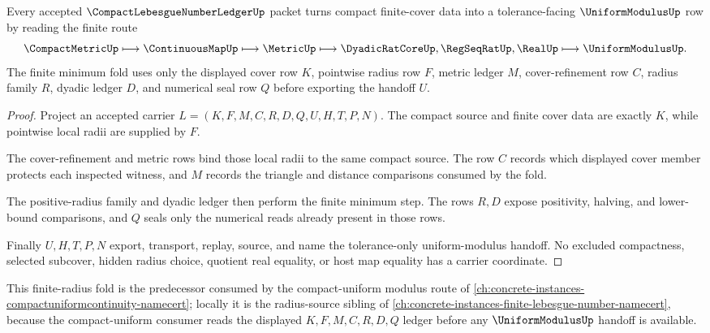 \begin{theorem}
\label{thm:compact-lebesgue-number-ledger-finite-radius-fold}
Every accepted $\CompactLebesgueNumberLedgerUp$ packet turns compact finite-cover data into a tolerance-facing $\UniformModulusUp$ row by reading the finite route
$$
\CompactMetricUp \longmapsto \ContinuousMapUp \longmapsto \MetricUp \longmapsto \DyadicRatCoreUp,\RegSeqRatUp,\RealUp \longmapsto \UniformModulusUp .
$$
The finite minimum fold uses only the displayed cover row $K$, pointwise radius row $F$, metric ledger $M$, cover-refinement row $C$, radius family $R$, dyadic ledger $D$, and numerical seal row $Q$ before exporting the handoff $U$.
\end{theorem}
\begin{proof}
Project an accepted carrier $L=(K,F,M,C,R,D,Q,U,H,T,P,N)$. The compact source and finite cover data are exactly $K$, while pointwise local radii are supplied by $F$.

The cover-refinement and metric rows bind those local radii to the same compact source. The row $C$ records which displayed cover member protects each inspected witness, and $M$ records the triangle and distance comparisons consumed by the fold.

The positive-radius family and dyadic ledger then perform the finite minimum step. The rows $R,D$ expose positivity, halving, and lower-bound comparisons, and $Q$ seals only the numerical reads already present in those rows.

Finally $U,H,T,P,N$ export, transport, replay, source, and name the tolerance-only uniform-modulus handoff. No excluded compactness, selected subcover, hidden radius choice, quotient real equality, or host map equality has a carrier coordinate.
\end{proof}

This finite-radius fold is the predecessor consumed by the compact-uniform modulus route of \autoref{ch:concrete-instances-compactuniformcontinuity-namecert}; locally it is the radius-source sibling of \autoref{ch:concrete-instances-finite-lebesgue-number-namecert}, because the compact-uniform consumer reads the displayed $K,F,M,C,R,D,Q$ ledger before any $\UniformModulusUp$ handoff is available.

